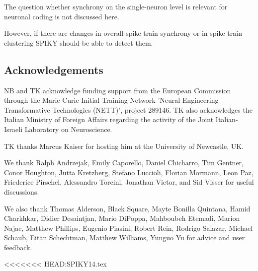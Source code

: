 \documentclass[10pt,twocolumn]{elsart5p}
\begin{document}
The question whether synchrony on the single-neuron level is relevant for neuronal coding is not discussed here.

However, if there are changes in overall spike train synchrony or in spike train clustering SPIKY should be able to detect them.


\vspace{1cm}

\begin{thanks}
\section{\label{s:Acknowledgement} \textbf{Acknowledgements}}

NB and TK acknowledge funding support from the European Commission through the Marie Curie Initial Training Network 'Neural Engineering Transformative Technologies (NETT)', project 289146. TK also acknowledges the Italian Ministry of Foreign Affairs regarding the activity of the Joint Italian-Israeli Laboratory on Neuroscience.

TK thanks Marcus Kaiser for hosting him at the University of Newcastle, UK.
     
We thank Ralph Andrzejak, Emily Caporello, Daniel Chicharro, Tim Gentner, Conor Houghton, Jutta Kretzberg, Stefano Luccioli, Florian Mormann, Leon Paz, Friederice Pirschel, Alessandro Torcini, Jonathan Victor, and Sid Visser for useful discussions.

We also thank Thomas Alderson, Black Square, Mayte Bonilla Quintana, Hamid Charkhkar, Didier Desaintjan, Mario DiPoppa, Mahboubeh Etemadi, Marion Najac, Matthew Phillips, Eugenio Piasini, Robert Rein, Rodrigo Salazar, Michael Schaub, Eitan Schechtman, Matthew Williams, Yunguo Yu for advice and user feedback.
\end{thanks}

<<<<<<< HEAD:SPIKY14.tex
\end{document}
